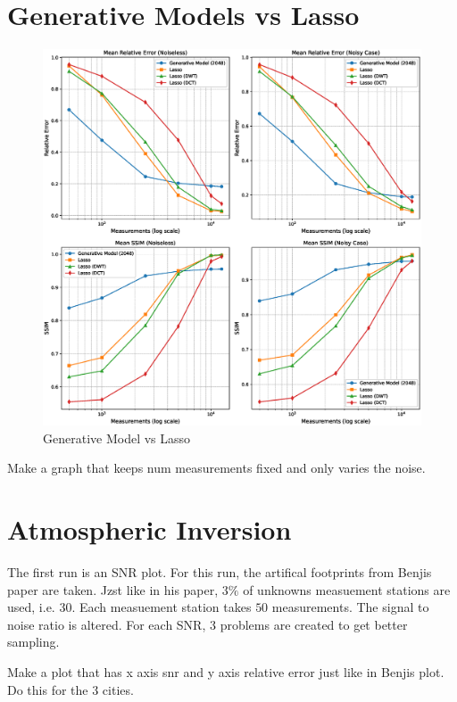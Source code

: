 \section{Generative Models vs Lasso}
\begin{figure}[h!]
    \centering
    \includegraphics[width=\textwidth]{figures/06_results/gen_vs_lasso.eps}
    \caption{Generative Model vs Lasso}
\end{figure}
Make a graph that keeps num measurements fixed and only varies the noise.

\section{Atmospheric Inversion}
The first run is an SNR plot.
For this run, the artifical footprints from Benjis paper are taken.
Jzst like in his paper, $3\%$ of unknowns measuement stations are used, i.e. 30.
Each measuement station takes $50$ measurements.
The signal to noise ratio is altered.
For each SNR, 3 problems are created to get better sampling.

Make a plot that has x axis snr and y axis relative error just like in Benjis plot.
Do this for the 3 cities.

